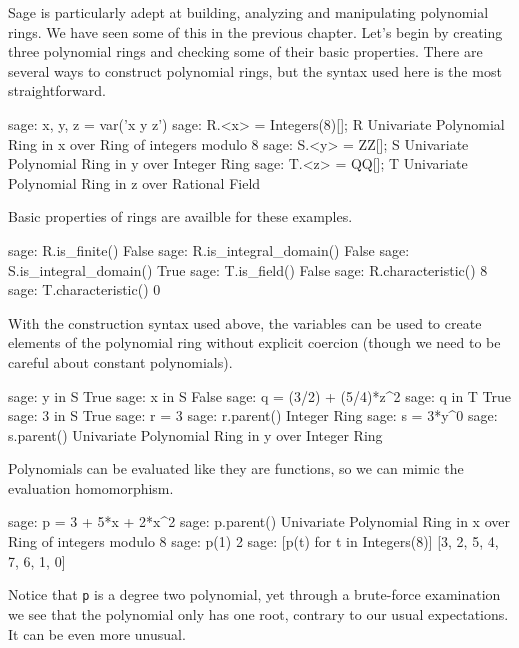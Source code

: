 Sage is particularly adept at building, analyzing and manipulating polynomial rings.  We have seen some of this in the previous chapter.  Let's begin by creating three polynomial rings and checking some of their basic properties.  There are several ways to construct polynomial rings, but the syntax used here is the most straightforward.
%
%
\begin{sageexample}
sage: x, y, z = var('x y z')
sage: R.<x> = Integers(8)[]; R
Univariate Polynomial Ring in x over Ring of integers modulo 8
sage: S.<y> = ZZ[]; S
Univariate Polynomial Ring in y over Integer Ring
sage: T.<z> = QQ[]; T
Univariate Polynomial Ring in z over Rational Field
\end{sageexample}
%
Basic properties of rings are availble for these examples.
%
\begin{sageexample}
sage: R.is_finite()
False
sage: R.is_integral_domain()
False
sage: S.is_integral_domain()
True
sage: T.is_field()
False
sage: R.characteristic()
8
sage: T.characteristic()
0
\end{sageexample}
%
With the construction syntax used above, the variables can be used to create elements of the polynomial ring without explicit coercion (though we need to be careful about constant polynomials).
%
\begin{sageexample}
sage: y in S
True
sage: x in S
False
sage: q = (3/2) + (5/4)*z^2
sage: q in T
True
sage: 3 in S
True
sage: r = 3
sage: r.parent()
Integer Ring
sage: s = 3*y^0
sage: s.parent()
Univariate Polynomial Ring in y over Integer Ring
\end{sageexample}
%
Polynomials can be evaluated like they are functions, so we can mimic the evaluation homomorphism.
%
\begin{sageexample}
sage: p = 3 + 5*x + 2*x^2
sage: p.parent()
Univariate Polynomial Ring in x over Ring of integers modulo 8
sage: p(1)
2
sage: [p(t) for t in Integers(8)]
[3, 2, 5, 4, 7, 6, 1, 0]
\end{sageexample}
%
Notice that \verb?p? is a degree two polynomial, yet through a brute-force examination we see that the polynomial only has one root, contrary to our usual expectations.  It can be even more unusual.
